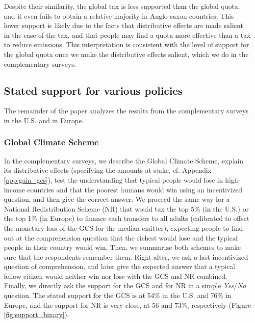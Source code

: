Despite their similarity, the global tax is less supported than the global quota, and it even fails to obtain a relative majority in Anglo-saxon countries. This lower support is likely due to the facts that distributive effects are made salient in the case of the tax, and that people may find a quota more effective than a tax to reduce emissions. This interpretation is consistent with the level of support for the global quota once we make the distributive effects salient, which we do in the complementary surveys. %


\subsection{Stated support for various policies}
The remainder of the paper analyzes the results from the complementary surveys in the U.S. and in Europe. %

\subsubsection{Global Climate Scheme} %
In the complementary surveys, we describe the Global Climate Scheme, explain its distributive effects (specifying the amounts at stake, cf. Appendix \ref{app:gain_gcs}), test the understanding that typical people would lose in high-income countries and that the poorest humans would win using an incentivized question, and then give the correct answer. We proceed the same way for a National Redistribution Scheme (NR) that would tax the top 5\% (in the U.S.) or the top 1\% (in Europe) to finance cash transfers to all adults (calibrated to offset the monetary loss of the GCS for the median emitter), expecting people to find out at the comprehension question that the richest would lose and the typical people in their country would win. Then, we summarize both schemes to make sure that the respondents remember them. Right after, we ask a last incentivized question of comprehension, and later give the expected answer that a typical fellow citizen would neither win nor lose with the GCS and NR combined. Finally, we directly ask the support for the GCS and for NR in a simple \textit{Yes}/\textit{No} question. The stated support for the GCS is at 54\% in the U.S. and 76\% in Europe, and the support for NR is very close, at 56 and 73\%, respectively (Figure \ref{fig:support_binary}).%

